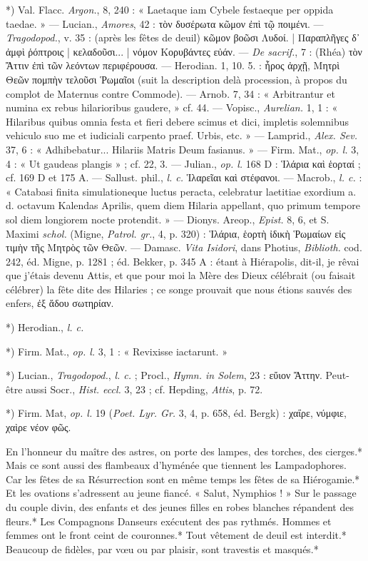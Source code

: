 \documentclass[a4paper, 11pt, oneside, polutonikogreek, french]{article}
\begin{document}
*) Val. Flacc. \emph{Argon.}, 8, 240 : « Laetaque iam Cybele festaeque per oppida taedae. » --- Lucian., \emph{Amores}, 42 : τὸν δυσέρωτα κῶμον ἐπὶ τῷ ποιμένι. --- \emph{Tragodopod.}, v. 35 : (après les fêtes de deuil) κῶμον βοῶσι Λυδοί. | Παραπλῆγες δ᾽ ἀμφὶ ῥόπτροις | κελαδοῦσι... | νόμον Kορυβάντες εὐάν. --- \emph{De sacrif.}, 7 : (Rhéa) τὸν Ἄττιν ἐπὶ τῶν λεόντων περιφέρουσα. --- Herodian. 1, 10. 5. : ἦρος ἀρχῇ, Μητρὶ Θεῶν πομπὴν τελοῦσι Ῥωμαῖοι (suit la description delà procession, à propos du complot de Maternus contre Commode). --- Arnob. 7, 34 : « Arbitrantur et numina ex rebus hilarioribus gaudere, » cf. 44. --- Vopisc., \emph{Aurelian.} 1, 1 : « Hilaribus quibus omnia festa et fieri debere scimus et dici, impletis solemnibus vehiculo suo me et iudiciali carpento praef. Urbis, etc. » --- Lamprid., \emph{Alex. Sev.} 37, 6 : « Adhibebatur... Hilariis Matris Deum fasianus. » --- Firm. Mat., \emph{op. l.} 3, 4 : « Ut gaudeas plangis » ; cf. 22, 3. --- Julian., \emph{op. l.} 168 D : Ἱλάρια καὶ ἑορταί ; cf. 169 D et 175 A. --- Sallust. phil., \emph{l. c.} Ἱλαρεῖαι καὶ στέφανοι. --- Macrob., \emph{l. c.} : « Catabasi finita simulationeque luctus peracta, celebratur laetitiae exordium a. d. octavum Kalendas Aprilis, quem diem Hilaria appellant, quo primum tempore sol diem longiorem nocte protendit. » --- Dionys. Areop., \emph{Epist.} 8, 6, et S. Maximi \emph{schol.} (Migne, \emph{Patrol. gr.}, 4, p. 320) : Ἱλάρια, ἑορτὴ ἰδικὴ Ῥωμαίων εἰς τιμὴν τῆς Mητρὸς τῶν Θεῶν. --- Damasc. \emph{Vita Isidori}, dans Photius, \emph{Biblioth.} cod. 242, éd. Migne, p. 1281 ; éd. Bekker, p. 345 A : étant à Hiérapolis, dit-il, je rêvai que j'étais devenu Attis, et que pour moi la Mère des Dieux célébrait (ou faisait célébrer) la fête dite des Hilaries ; ce songe prouvait que nous étions sauvés des enfers, ἐξ ἅδου σωτηρίαν.

*) Herodian., \emph{l. c.}

*) Firm. Mat., \emph{op. l.} 3, 1 : « Revixisse iactarunt. »

*) Lucian., \emph{Tragodopod.}, \emph{l. c.} ; Procl., \emph{Hymn. in Solem}, 23 : εὔιον Ἄττην. Peut-être aussi Socr., \emph{Hist. eccl.} 3, 23 ; cf. Hepding, \emph{Attis}, p. 72.

*) Firm. Mat, \emph{op. l.} 19 (\emph{Poet. Lyr. Gr.} 3, 4, p. 658, éd. Bergk) : χαΐρε, νύμφιε, χαὶρε νέον φῶς.

En l'honneur du maître des astres, on porte des lampes, des torches, des cierges.* Mais ce sont aussi des flambeaux d'hyménée que tiennent les Lampadophores. Car les fêtes de sa Résurrection sont en même temps les fêtes de sa Hiérogamie.* Et les ovations s'adressent au jeune fiancé. « Salut, Nymphios ! » Sur le passage du couple divin, des enfants et des jeunes filles en robes blanches répandent des fleurs.* Les Compagnons Danseurs exécutent des pas rythmés. Hommes et femmes ont le front ceint de couronnes.* Tout vêtement de deuil est interdit.* Beaucoup de fidèles, par vœu ou par plaisir, sont travestis et masqués.*
\end{document}
